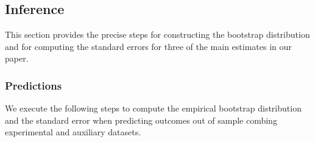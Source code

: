 \subsection{Inference} \label{appendix:bootstrap}

\noindent This section provides the precise steps for constructing the bootstrap distribution and for computing the standard errors for three of the main estimates in our paper.

\subsubsection{Predictions} \label{appendix:bootstrapspreds}

\noindent We execute the following steps to compute the empirical bootstrap distribution and the standard error when predicting outcomes out of sample combing experimental and auxiliary datasets.

